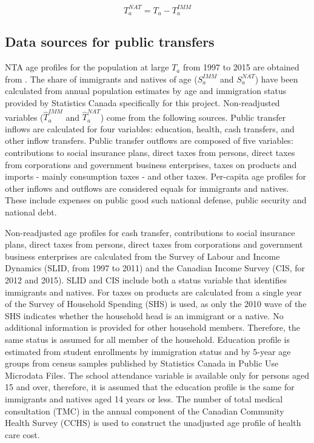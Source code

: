 \begin{equation}\label{eq:nat}
 {T}^{NAT}_a ={T}_a -{T}^{IMM}_a
\end{equation}

\subsection*{Data sources for public transfers}

NTA age profiles for the population at large \({T}_a \) from 1997 to 2015 are obtained from  \citet{Merette:2019kz}.
The share of immigrants and natives of age (\( S^{IMM}_a \) and \( S^{NAT}_a \)) have been calculated from annual population estimates by age and immigration status provided by Statistics Canada specifically for this project.
Non-readjusted variables (\(\hat{T}^{IMM}_a \) and \(\hat{T}^{NAT}_a \)) come from the following sources.
Public transfer inflows are calculated for four variables: education, health, cash transfers, and other inflow transfers.
Public transfer outflows are composed of five variables: contributions to social insurance plans, direct taxes from persons, direct taxes from corporations and government business enterprises, taxes on products and imports - mainly consumption taxes - and other taxes.
Per-capita age profiles for other inflows and outflows are considered equals for immigrants and natives. These include expenses on public good such national defense, public security and national debt.

\vspace{0.7em}\par
Non-readjusted age profiles for cash transfer, contributions to social insurance plans, direct taxes from persons, direct taxes from corporations and government business enterprises are calculated from the Survey of Labour and Income Dynamics (SLID, from 1997 to 2011) and the Canadian Income Survey (CIS, for 2012 and 2015).
SLID and CIS include both a status variable that identifies immigrants and natives.
For taxes on products are calculated from a single year of the Survey of Household Spending (SHS) is used, as only the 2010 wave of the SHS indicates whether the household head is an immigrant or a native.
No additional information is provided for other household members.
Therefore, the same status is assumed for all member of the household.
Education profile is estimated from student enrollments by immigration status and by 5-year age groups from census samples published by Statistics Canada in Public Use Microdata Files. The school attendance variable is available only for persons aged 15 and over, therefore, it is assumed that the education profile is the same for immigrants and natives aged 14 years or less.
The number of total medical consultation (TMC) in the annual component of the Canadian Community Health Survey (CCHS) is used to construct the unadjusted age profile of health care cost.

